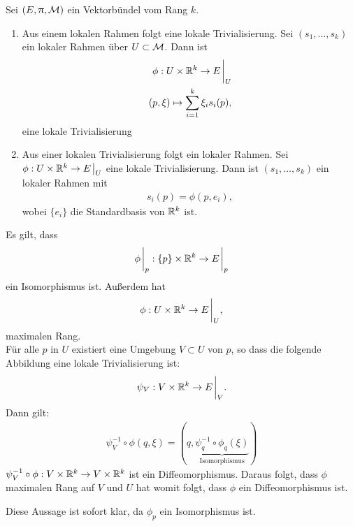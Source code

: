\begin{satz}
\label{satz:lokalrahmentrivialisierung}
Sei $(E, \uppi, \mathcal{M})$ ein Vektorbündel vom Rang $k$.
\begin{enumerate}
\item Aus einem lokalen Rahmen folgt eine lokale Trivialisierung.
Sei $(s_1, \dots, s_k)$ ein lokaler Rahmen über $U\subset\mathcal{M}$.
Dann ist 
\begin{align}
\phi : U \times \R^k \to E \eval_U\\
(p, \xi) \mapsto \sum^k_{i=1} \xi_i s_i (p),
\end{align}
eine lokale Trivialisierung
\item  Aus einer lokalen Trivialisierung folgt ein lokaler Rahmen.
Sei $\phi: U \times \R^k \to E \eval_U$ eine lokale Trivialisierung.
Dann ist $(s_1, \dots, s_k)$ ein lokaler Rahmen mit 
\begin{align}
s_i(p) = \phi (p, e_i),
\end{align} 
wobei $\{ e_i \}$ die Standardbasis von $\mathbb{R}^k$ ist.
\end{enumerate}
\end{satz}
\begin{bew}
Es gilt, dass 
\begin{align}
\phi \eval_p : \{ p \} \times \R^k \to E \eval_p
\end{align}
ein Isomorphismus ist.
Außerdem hat
\begin{align}
\phi : U \times \R^k \to E \eval_U,
\end{align}
maximalen Rang.\\
Für alle $p$ in $U$ existiert eine Umgebung $V \subset U$ von $p$, so dass die folgende Abbildung eine lokale Trivialisierung ist:
\begin{align}
\psi_V : V\times \R^k \to E \eval_V.
\end{align}
Dann gilt:
\begin{align}
\psi^{-1}_V \circ  \phi (q, \xi) = (q, \underbrace{\psi^{-1}_q \circ \phi_q(\xi)}_{\mathrm{Isomorphismus}})
\end{align}
$\psi^{-1}_V \circ \phi : V \times \mathbb{R}^k \to V \times \mathbb{R}^k$ ist ein Diffeomorphismus.
Daraus folgt, dass $\phi$ maximalen Rang auf $V$ und $U$ hat womit folgt, dass $\phi$ ein Diffeomorphismus ist.
\end{bew}
\begin{bew}
Diese Aussage ist sofort klar, da $\phi_p$ ein Isomorphismus ist.
\end{bew}

